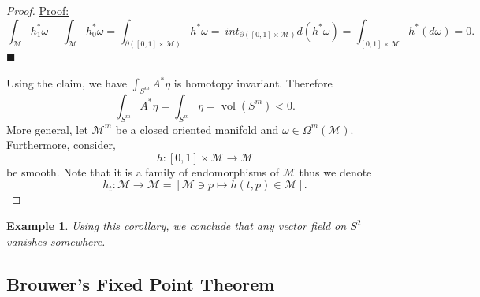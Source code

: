 \documentclass[10pt]{article}
\newtheorem{example}{Example}[section]
\newenvironment{claimproof}[1]{\par\noindent\underline{Proof:}\space#1}{\hfill $\blacksquare$}
\DeclareMathOperator{\vol}{vol}
\newcommand{\M}[0]{\mathcal{M}}
\begin{document}
\begin{proof}
\begin{claimproof}
\begin{equation*}
      \int_\M h^*_1\omega - \int_\M h^*_0\omega = \int_{\partial([0,1]\times\M)}h^*_{\cdot}\omega = \
      int_{\partial([0,1]\times\M)}d(h_\cdot^*\omega) = \int_{[0,1]\times\M}h^*(d\omega) = 0.
    \end{equation*}
  \end{claimproof}
  \par Using the claim, we have $\int_{S^m}A^*\eta$ is homotopy invariant. Therefore 
  \begin{equation*}
    \int_{S^m}A^*\eta = \int_{S^m}\eta  = \vol(S^m)<0.
  \end{equation*}
  More general, let $\M^m$ be a closed oriented manifold and $\omega\in\Omega^m(\M)$. Furthermore, consider,
  \begin{equation*}
    h:[0,1]\times\M\to\M
  \end{equation*}
  be smooth. Note that it is a family of endomorphisms of $\M$ thus we denote 
  \begin{equation*}
    h_t:\M\to\M = [\M\ni p\mapsto h(t,p)\in\M].
  \end{equation*}
\end{proof}
\begin{example}
  Using this corollary, we conclude that any vector field on $S^2$ vanishes somewhere.
\end{example}
\subsection{Brouwer's Fixed Point Theorem}
\end{document}
